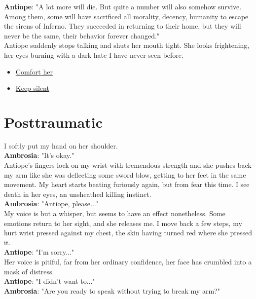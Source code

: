 \documentclass{report}
\newcommand{\speaker}[1]{
	\textbf{#1}: 
}
\newcommand{\glink}[2]{
	\hyperref[#1]{#2}
}
\newcommand{\gsection}[1]{
	\section*{#1}
	\label{#1}
}
\begin{document}
\speaker{Antiope} "A lot more will die. But quite a number will also somehow survive. Among them, some will have sacrificed all morality, decency, humanity to escape the sirens of Inferno. They succeeded in returning to their home, but they will never be the same, their behavior forever changed."\\

Antiope suddenly stops talking and shuts her mouth tight. She looks frightening, her eyes burning with a dark hate I have never seen before.\\

\begin{itemize}
	\item \glink{Posttraumatic}{Comfort her}
	\item \glink{Fleeing the past}{Keep silent}
\end{itemize}

\gsection{Posttraumatic}

I softly put my hand on her shoulder.\\

\speaker{Ambrosia} "It's okay."\\

Antiope's fingers lock on my wrist with tremendous strength and she pushes back my arm like she was deflecting some sword blow, getting to her feet in the same movement. My heart starts beating furiously again, but from fear this time. I see death in her eyes, an unsheathed killing instinct.\\

\speaker{Ambrosia} "Antiope, please..."\\

My voice is but a whisper, but seems to have an effect nonetheless. Some emotions return to her sight, and she releases me. I move back a few steps, my hurt wrist pressed against my chest, the skin having turned red where she pressed it.\\

\speaker{Antiope} "I'm sorry..."\\

Her voice is pitiful, far from her ordinary confidence, her face has crumbled into a mask of distress.\\

\speaker{Antiope} "I didn't want to..."\\

\speaker{Ambrosia} "Are you ready to speak without trying to break my arm?"\\
\end{document}
